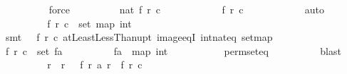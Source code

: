 \begin{isabellebody}
\ \ \ \ \ \ \ \ \isamarkupfalse%
\ force\isanewline
\ \ \ \ \ \ \isamarkupfalse%
\ \isamarkupfalse%
\ {\isachardoublequoteopen}nat\ {\isacharparenleft}f\ r\ c{\isacharparenright}\ {\isasymin}\ {\isacharbraceleft}{}{\isachardot}{\isachardot}{\isacharless}{}{}{}{}{\isacharplus}{}{\isacharbraceright}{\isachardoublequoteclose}\isanewline
\ \ \ \ \ \ \ \ \isamarkupfalse%
\ {\isacharbackquoteopen}f\ r\ c\ {\isasymle}\ {}{}{}{}{\isacharbackquoteclose}\isanewline
\ \ \ \ \ \ \ \ \isamarkupfalse%
\ auto\ \ \ \ \ \ \isanewline
\ \ \ \ \ \ \isamarkupfalse%
\ \isamarkupfalse%
\ {\isachardoublequoteopen}f\ r\ c\ {\isasymin}\ set\ {\isacharparenleft}map\ int\ {\isacharbrackleft}{}{\isachardot}{\isachardot}{\isacharless}{}{}{}{}{\isacharplus}{}{\isacharbrackright}{\isacharparenright}{\isachardoublequoteclose}\isanewline
\ \ \ \ \ \ \ \ \isamarkupfalse%
\ {\isacharparenleft}smt\ {\isacartoucheopen}{}\ {\isasymle}\ f\ r\ c{\isacartoucheclose}\ atLeastLessThan{\isacharunderscore}upt\ image{\isacharunderscore}eqI\ int{\isacharunderscore}nat{\isacharunderscore}eq\ set{\isacharunderscore}map{\isacharparenright}\isanewline
\ \ \ \ \ \ \isamarkupfalse%
\ \isamarkupfalse%
\ {\isachardoublequoteopen}f\ r\ c\ {\isasymin}\ set\ {\isacharquery}fa{\isachardoublequoteclose}\isanewline
\ \ \ \ \ \ \ \ \isamarkupfalse%
\ {\isacharbackquoteopen}{\isacharquery}fa\ {\isacharless}{\isachartilde}{\isachartilde}{\isachargreater}\ map\ int\ {\isacharbrackleft}{}{\isachardot}{\isachardot}{\isacharless}{}{}{}{}{\isacharplus}{}{\isacharbrackright}{\isacharbackquoteclose}\isanewline
\ \ \ \ \ \ \ \ \isamarkupfalse%
\ perm{\isacharunderscore}set{\isacharunderscore}eq\isanewline
\ \ \ \ \ \ \ \ \isamarkupfalse%
\ blast\isanewline
\ \ \ \ \ \ \isamarkupfalse%
\ \isamarkupfalse%
\ r{\isacharprime}\ \ {\isachardoublequoteopen}r{\isacharprime}\ {\isacharless}\ {}{}{}{}{\isachardoublequoteclose}\ {\isachardoublequoteopen}f\ r{\isacharprime}\ {\isacharparenleft}a\ r{\isacharprime}{\isacharparenright}\ {\isacharequal}\ f\ r\ c{\isachardoublequoteclose}\isanewline

\end{isabellebody}
